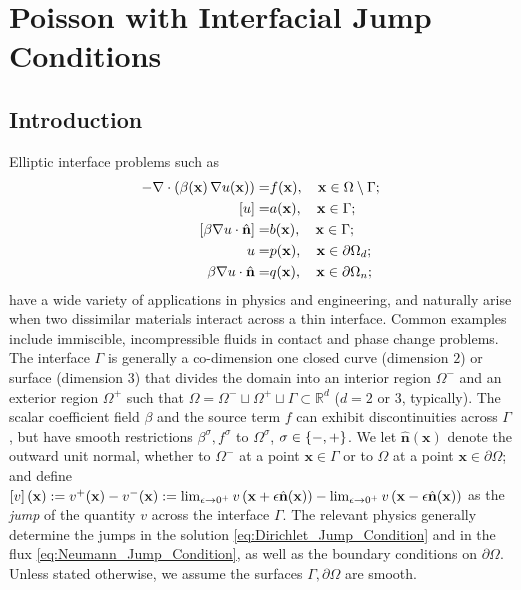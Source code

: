 %

\chapter{Poisson with Interfacial Jump Conditions}

\section{Introduction} \label{sec:2.Introduction}
Elliptic interface problems such as
\begin{align}
-\nabla \cdot \left( \beta(\mathbf{x} \right) \nabla u(\mathbf{x})) = & f(\mathbf{x}), \quad \mathbf{x} \in \Omega \setminus \Gamma; \label{eq:2.Poisson} \\
\left[ u \right] = & a(\mathbf{x}), \quad \mathbf{x} \in \Gamma; \label{eq:2.Dirichlet_Jump_Condition} \\
\left[ \beta \nabla u \cdot \hat{\mathbf{n}} \right] = & b(\mathbf{x}), \quad \mathbf{x} \in \Gamma; \label{eq:2.Neumann_Jump_Condition} \\
u = & p(\mathbf{x}), \quad \mathbf{x} \in \partial\Omega_d; \label{eq:2.Dirichlet_Boundary_Condition} \\
\beta \nabla u \cdot \hat{\mathbf{n}} = & q(\mathbf{x}), \quad \mathbf{x} \in \partial\Omega_n; \label{eq:2.Neumann_Boundary_Condition}
\end{align}
have a wide variety of applications in physics and engineering, and naturally arise when two dissimilar materials interact across a thin interface. Common examples include immiscible, incompressible fluids in contact and phase change problems. The interface $\Gamma$ is generally a co-dimension one closed curve (dimension $2$) or surface (dimension $3$) that divides the domain into an interior region $\Omega^-$ and an exterior region $\Omega^+$ such that $\Omega = \Omega^- \sqcup \Omega^+ \sqcup \Gamma \subset \mathbb{R}^d$ ($d = 2 \text{ or } 3$, typically). The scalar coefficient field $\beta$ and the source term $f$ can exhibit discontinuities across $\Gamma$, but have smooth restrictions $\beta^{\sigma}, f^{\sigma}$ to $\Omega^{\sigma}$, $\sigma \in \left\{ -,+ \right\}$. We let $\hat{\mathbf{n}}(\mathbf{x})$ denote the outward unit normal, whether to $\Omega^-$ at a point $\mathbf{x} \in \Gamma$ or to $\Omega$ at a point $\mathbf{x} \in \partial\Omega$; and define $\left[ v \right](\mathbf{x}) := v^+(\mathbf{x}) - v^-(\mathbf{x}) := \lim_{\epsilon \to 0^+} v \left( \mathbf{x} + \epsilon \hat{\mathbf{n}}(\mathbf{x}) \right) - \lim_{\epsilon \to 0^+} v \left( \mathbf{x} - \epsilon \hat{\mathbf{n}}(\mathbf{x}) \right)$ as the \emph{jump} of the quantity $v$ across the interface $\Gamma$. The relevant physics generally determine the jumps in the solution \eqref{eq:Dirichlet_Jump_Condition} and in the flux \eqref{eq:Neumann_Jump_Condition}, as well as the boundary conditions on $\partial\Omega$. Unless stated otherwise, we assume the surfaces $\Gamma,\partial\Omega$ are smooth.

